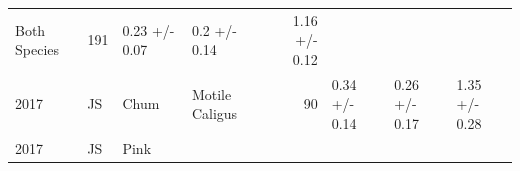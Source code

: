 \documentclass[fleqn,10pt]{wlpeerj} %
\begin{document}
\begin{longtable}[]{@{}llllrlll@{}}
\begin{minipage}[t]{0.11\columnwidth}
Both Species\strut
\end{minipage} & \begin{minipage}[t]{0.04\columnwidth}\raggedleft\strut
191\strut
\end{minipage} & \begin{minipage}[t]{0.14\columnwidth}\raggedright\strut
0.23 +/- 0.07\strut
\end{minipage} & \begin{minipage}[t]{0.14\columnwidth}\raggedright\strut
0.2 +/- 0.14\strut
\end{minipage} & \begin{minipage}[t]{0.14\columnwidth}\raggedright\strut
1.16 +/- 0.12\strut
\end{minipage}\tabularnewline
\begin{minipage}[t]{0.09\columnwidth}\raggedright\strut
2017\strut
\end{minipage} & \begin{minipage}[t]{0.06\columnwidth}\raggedright\strut
JS\strut
\end{minipage} & \begin{minipage}[t]{0.06\columnwidth}\raggedright\strut
Chum\strut
\end{minipage} & \begin{minipage}[t]{0.11\columnwidth}\raggedright\strut
Motile Caligus\strut
\end{minipage} & \begin{minipage}[t]{0.04\columnwidth}\raggedleft\strut
90\strut
\end{minipage} & \begin{minipage}[t]{0.14\columnwidth}\raggedright\strut
0.34 +/- 0.14\strut
\end{minipage} & \begin{minipage}[t]{0.14\columnwidth}\raggedright\strut
0.26 +/- 0.17\strut
\end{minipage} & \begin{minipage}[t]{0.14\columnwidth}\raggedright\strut
1.35 +/- 0.28\strut
\end{minipage}\tabularnewline
\begin{minipage}[t]{0.09\columnwidth}\raggedright\strut
2017\strut
\end{minipage} & \begin{minipage}[t]{0.06\columnwidth}\raggedright\strut
JS\strut
\end{minipage} & \begin{minipage}[t]{0.06\columnwidth}\raggedright\strut
Pink\strut
\end{minipage} & \begin{minipage}[t]{0.11\columnwidth}\raggedright\strut

\end{minipage}
\end{longtable}
\end{document}

